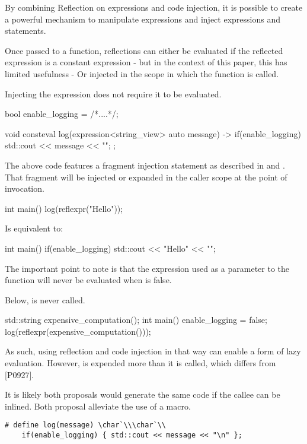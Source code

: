 \documentclass{wg21}
\begin{document}
By combining Reflection on expressions and code injection, it is possible to create a powerful
mechanism to manipulate expressions and inject expressions and statements.
 
Once passed to a  function, reflections can either be evaluated if the reflected expression is a constant expression
- but in the context of this paper, this has limited usefulness - Or injected in the scope in which the function is called.

Injecting the expression does not require it to be evaluated.

\begin{colorblock}
bool enable_logging = /*....*/;

void consteval log(expression<string_view> auto message) {
  -> {
        if(enable_logging) {
            std::cout << message << "\n";
        }
    };
}
\end{colorblock}

The above code features a fragment injection statement as described in \cite{P0712R0} and \cite{P0633R0}.
That fragment will be injected or expanded in the caller scope at the point of invocation.

\begin{colorblock}
int main() {
    log(reflexpr("Hello"));
}
\end{colorblock}

Is equivalent to:

\begin{colorblock}
int main() {
   if(enable_logging) {
       std::cout << "Hello" << "\n";
   }
}
\end{colorblock}

The important point to note is that the expression used as a parameter to the  function will never be evaluated
when  is false.

Below,  is never called.

\begin{colorblock}
std::string expensive_computation();
int main() {
    enable_logging = false;
    log(reflexpr(expensive_computation()));
}
\end{colorblock}

As such, using reflection and code injection in that way can enable a form of lazy evaluation.
However,  is expended more than it is called, which differs from [P0927]\cite{P0927R2}.

It is likely both proposals would generate the same code if the callee can be inlined.
Both proposal alleviate the use of a macro.
\begin{lstlisting}
# define log(message) \char`\\\char`\\
    if(enable_logging) { std::cout << message << "\n" };
\end{lstlisting}
\end{document}

